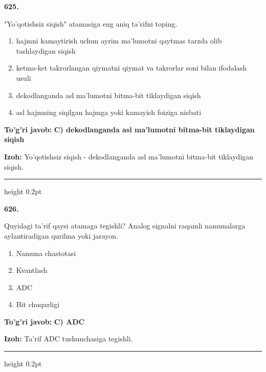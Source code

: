 \documentclass[10pt,a4paper,oneside]{article}
\begin{document}
\noindent\textbf{\color{ink}625.}
\par
"Yo'qotishsiz siqish" atamasiga eng aniq ta'rifni toping.
\begin{enumerate}[label=\Alph*),leftmargin=9mm]
\item hajmni kamaytirish uchun ayrim ma'lumotni qaytmas tarzda olib tashlaydigan siqish
\item ketma-ket takrorlangan qiymatni qiymat va takrorlar soni bilan ifodalash usuli
\item dekodlanganda asl ma'lumotni bitma-bit tiklaydigan siqish
\item asl hajmning siqilgan hajmga yoki kamayish foiziga nisbati
\end{enumerate}
\begin{tcolorbox}[enhanced,breakable,colback=teal!4,colframe=teal!50!black,boxrule=0.5pt,arc=1.1mm,left=3mm,right=3mm,top=1.7mm,bottom=1.7mm,before skip=2mm,after skip=2mm]
\textbf{\color{teal}To'g'ri javob:} \textbf{C) dekodlanganda asl ma'lumotni bitma-bit tiklaydigan siqish}
\par\smallskip
\textbf{Izoh:} Yo'qotishsiz siqish - dekodlanganda asl ma'lumotni bitma-bit tiklaydigan siqish.
\end{tcolorbox}
\vspace{2mm}\hrule height 0.2pt \vspace{3mm}

\noindent\textbf{\color{ink}626.}
\par
Quyidagi ta'rif qaysi atamaga tegishli? Analog signalni raqamli namunalarga aylantiradigan qurilma yoki jarayon.
\begin{enumerate}[label=\Alph*),leftmargin=9mm]
\item Namuna chastotasi
\item Kvantlash
\item ADC
\item Bit chuqurligi
\end{enumerate}
\begin{tcolorbox}[enhanced,breakable,colback=teal!4,colframe=teal!50!black,boxrule=0.5pt,arc=1.1mm,left=3mm,right=3mm,top=1.7mm,bottom=1.7mm,before skip=2mm,after skip=2mm]
\textbf{\color{teal}To'g'ri javob:} \textbf{C) ADC}
\par\smallskip
\textbf{Izoh:} Ta'rif ADC tushunchasiga tegishli.
\end{tcolorbox}
\vspace{2mm}\hrule height 0.2pt \vspace{3mm}
\end{document}
